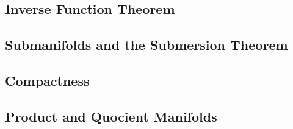 \subsection{Inverse Function Theorem}

\subsection{Submanifolds and the Submersion Theorem}

\subsection{Compactness}

\subsection{Product and Quocient Manifolds}




\cleardoublepage